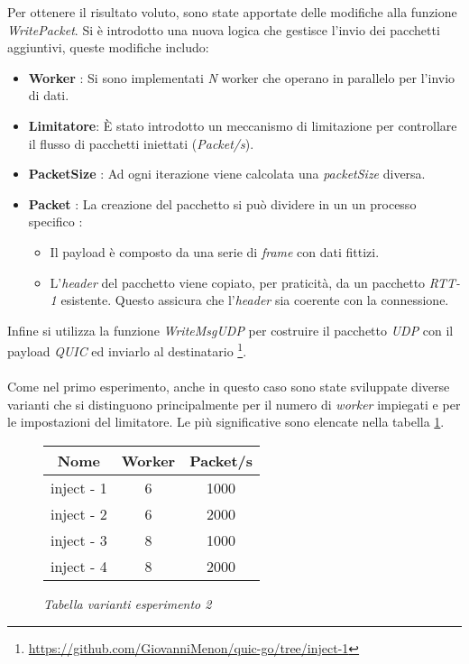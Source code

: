 Per ottenere il risultato voluto, sono state apportate delle modifiche alla funzione \emph{WritePacket}. Si è introdotto una nuova logica che gestisce l'invio dei pacchetti aggiuntivi, queste modifiche includo: 
\begin{itemize}
    \item \textbf{Worker} : Si sono implementati \emph{N} worker che operano in parallelo per l'invio di dati. 
    \item \textbf{Limitatore}: È stato introdotto un meccanismo di limitazione per controllare il flusso di pacchetti iniettati (\emph{Packet/s}). 
    \item \textbf{PacketSize} : Ad ogni iterazione viene calcolata una \emph{packetSize} diversa. 
    \item \textbf{Packet} : La creazione del pacchetto si può dividere in un un processo specifico :
    \begin{itemize}
        \item Il payload è composto da una serie di \emph{frame} con dati fittizi.
        \item L'\emph{header} del pacchetto viene copiato, per praticità, da un pacchetto \emph{RTT-1} esistente. Questo assicura che l'\emph{header} sia coerente con la connessione.
    \end{itemize}
\end{itemize}
\noindent Infine si utilizza la funzione \emph{WriteMsgUDP} per costruire il pacchetto \emph{UDP} con il payload \emph{QUIC} ed inviarlo al destinatario \footnote{\url{https://github.com/GiovanniMenon/quic-go/tree/inject-1}}.
\\\\
Come nel primo esperimento, anche in questo caso sono state sviluppate diverse varianti che si distinguono principalmente per il numero di \emph{worker} impiegati e per le impostazioni del limitatore. Le più significative sono elencate nella tabella \ref{table-inject}.
\begin{figure}[!h]
    \centering
    \begin{tabular}{|c|c|c|}
        \hline
        \textbf{Nome} & \textbf{Worker} & \textbf{Packet/s} \\
        \hline
        inject - 1  & 6 & 1000 \\
        \hline
        inject - 2 & 6 & 2000 \\
        \hline
        inject - 3 & 8 & 1000 \\
        \hline
        inject - 4 & 8 & 2000 \\
        \hline
    \end{tabular}
    \caption{\emph{Tabella varianti esperimento 2}}
    \label{table-inject}
\end{figure}
\pagebreak
